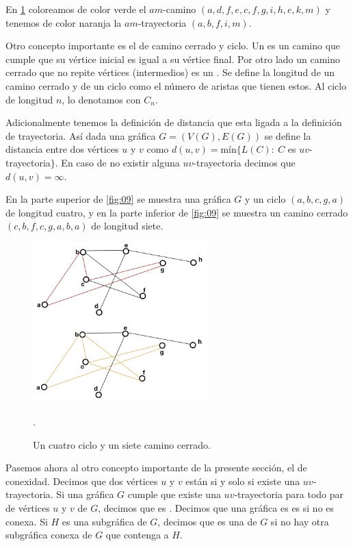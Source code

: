 En \cref{fig:08} coloreamos de color verde el $am$-camino $(a,d,f,e,c,f,g,i,h,e,k,m)$ y tenemos de color naranja la $am$-trayectoria $(a,b,f,i,m)$.

Otro concepto importante es el de camino cerrado y ciclo. Un  es un camino que cumple que su vértice inicial es igual a su vértice final. Por otro lado un camino cerrado que no repite vértices (intermedios) es un . Se define la longitud de un camino cerrado y de un ciclo como el número de aristas que tienen estos. Al ciclo de longitud $n$, lo denotamos con $C_n$.



Adicionalmente tenemos la definición de distancia que esta ligada a la definición de trayectoria. Así dada una gráfica $G=(V(G),E(G))$ se define la distancia entre dos vértices $u$ y $v$ como $d(u,v)=$m\'in$ \{L(C) \colon\ C$ es $uv$-trayectoria$ \}$. En caso de no existir alguna $uv$-trayectoria decimos que $d(u,v)=\infty$. 

En la parte superior de \cref{fig:09} se muestra una gráfica $G$ y un ciclo $(a,b,c,g,a)$ de longitud cuatro, y en la parte inferior de \cref{fig:09} se muestra un camino cerrado $(c,b,f,c,g,a,b,a)$ de longitud siete.

\begin{figure}[H]
  \centering
  \includegraphics[width=0.6\textwidth]{recursos/capturas/13.jpg}
  \caption{Un cuatro ciclo y un siete camino cerrado.}.
  \label{fig:08}
\end{figure}

Pasemos ahora al otro concepto importante de la presente sección, el de conexidad. Decimos que dos vértices  $u$ y $v$ están  si y solo si existe una $uv$-trayectoria. Si una gráfica $G$ cumple que existe una $uv$-trayectoria para todo par de vértices $u$ y $v$ de $G$, decimos que es . Decimos que una gr\'afica es es  si no es conexa.
Si $H$ es una subgráfica de $G$, decimos que es una  de $G$ si no hay otra subgráfica conexa de $G$ que contenga a $H$.

